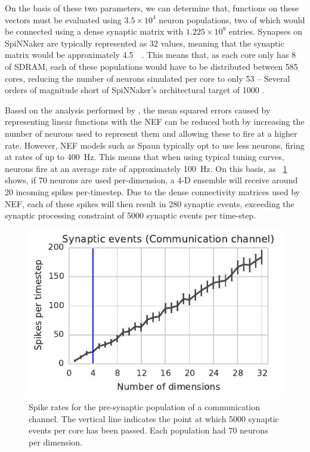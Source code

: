 \documentclass[conference]{IEEEtran}
\begin{document}
On the basis of these two parameters, we can determine that, functions on these vectors must be evaluated using $3.5\times10^4$ neuron populations, two of which would be connected using a dense synaptic matrix with $1.225\times10^9$ entries. Synapses on SpiNNaker are typically represented as \SI{32}{\bit} values, meaning that the synaptic matrix would be approximately \SI{4.5}{\gibi\byte}. This means that, as each core only has \SI{8}{\mebi\byte} of SDRAM, each of these populations would have to be distributed between 585 cores, reducing the number of neurons simulated per core to only 53 -- Several orders of magnitude short of SpiNNaker's architectural target of 1000 \parencite{}. 

Based on the analysis performed by \textcite{Eliasmith2004}, the mean squared errors caused by representing linear functions with the NEF can be reduced both by increasing the number of neurons used to represent them and allowing these to fire at a higher rate. 
However, NEF models such as Spaun typically opt to use less neurons, firing at rates of up to \SI{400}{\hertz}. 
This means that when using typical tuning curves, neurons fire at an average rate of approximately \SI{100}{\hertz}. 
On this basis, as \figurename~\ref{fig:results/network-utilisation} shows, if 70 neurons are used per-dimension, a 4-D ensemble will receive around 20 incoming spikes  per-timestep.
Due to the dense connectivity matrices used by NEF, each of these spikes will then result in 280 synaptic events, exceeding the synaptic processing constraint of 5000 synaptic events per time-step.

  \begin{figure}[!t]
    \centering
    \includegraphics[scale=0.8]{figures/network-1}
    \caption{Spike rates for the pre-synaptic population of a communication channel.  The vertical line indicates the point at which \num{5000} synaptic events per core has been passed. Each population had 70 neurons per dimension.}
    \label{fig:results/network-utilisation}
  \end{figure}
\end{document}
